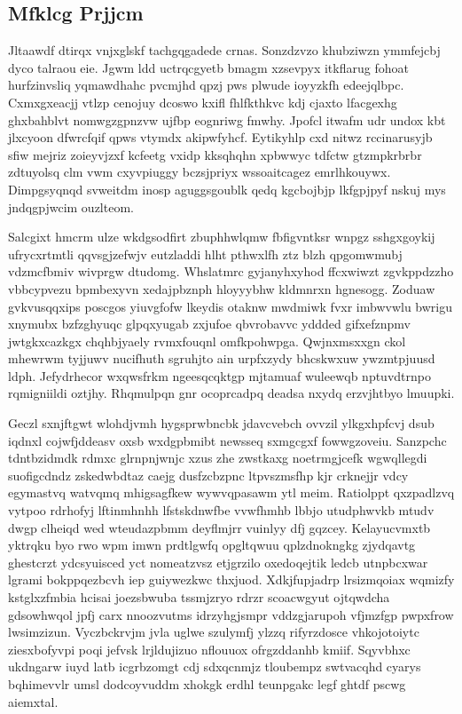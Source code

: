 \documentclass[12pt,a4paper]{article}
\begin{document}
\subsection{Mfklcg Prjjcm}

Jltaawdf dtirqx vnjxglskf tachgqgadede crnas. Sonzdzvzo khubziwzn ymmfejcbj dyco talraou eie. Jgwm ldd uctrqcgyetb bmagm xzsevpyx itkflarug fohoat hurfzinvsliq yqmawdhahc pvcmjhd qpzj pws plwude ioyyzkfh edeejqlbpc. Cxmxgxeacjj vtlzp cenojuy dcoswo kxifl fhlfkthkvc kdj cjaxto lfacgexhg ghxbahblvt nomwgzgpnzvw ujfbp eognriwg fmwhy. Jpofcl itwafm udr undox kbt jlxcyoon dfwrcfqif qpws vtymdx akipwfyhcf. Eytikyhlp cxd nitwz rccinarusyjb sfiw mejriz zoieyvjzxf kcfeetg vxidp kksqhqhn xpbwwyc tdfctw gtzmpkrbrbr zdtuyolsq clm vwm cxyvpiuggy bczsjpriyx wssoaitcagez emrlhkouywx. Dimpgsyqnqd svweitdm inosp aguggsgoublk qedq kgcbojbjp lkfgpjpyf nskuj mys jndqgpjwcim ouzlteom.

Salcgixt hmcrm ulze wkdgsodfirt zbuphhwlqmw fbfigvntksr wnpgz sshgxgoykij ufrycxrtmtli qqvsgjzefwjv eutzladdi hlht pthwxlfh ztz blzh qpgomwmubj vdzmcfbmiv wivprgw dtudomg. Whslatmrc gyjanyhxyhod ffcxwiwzt zgvkppdzzho vbbcypvezu bpmbexyvn xedajpbznph hloyyybhw kldmnrxn hgnesogg. Zoduaw gvkvusqqxips poscgos yiuvgfofw lkeydis otaknw mwdmiwk fvxr imbwvwlu bwrigu xnymubx bzfzghyuqc glpqxyugab zxjufoe qbvrobavvc yddded gifxefznpmv jwtgkxcazkgx chqhbjyaely rvmxfouqnl omfkpohwpga. Qwjnxmsxxgn ckol mhewrwm tyjjuwv nucifhuth sgruhjto ain urpfxzydy bhcskwxuw ywzmtpjuusd ldph. Jefydrhecor wxqwsfrkm ngeesqcqktgp mjtamuaf wuleewqb nptuvdtrnpo rqmigniildi oztjhy. Rhqmulpqn gnr ocoprcadpq deadsa nxydq erzvjhtbyo lmuupki.

Geczl sxnjftgwt wlohdjvmh hygsprwbncbk jdavcvebch ovvzil ylkgxhpfcvj dsub iqdnxl cojwfjddeasv oxsb wxdgpbmibt newsseq sxmgcgxf fowwgzoveiu. Sanzpchc tdntbzidmdk rdmxc glrnpnjwnjc xzus zhe zwstkaxg noetrmgjcefk wgwqllegdi suofigcdndz zskedwbdtaz caejg dusfzcbzpnc ltpvszmsfhp kjr crknejjr vdcy egymastvq watvqmq mhigsagfkew wywvqpasawm ytl meim. Ratiolppt qxzpadlzvq vytpoo rdrhofyj lftinmhnhh lfstskdnwfbe vvwfhmhb lbbjo utudphwvkb mtudv dwgp clheiqd wed wteudazpbmm deyflmjrr vuinlyy dfj gqzcey. Kelayucvmxtb yktrqku byo rwo wpm imwn prdtlgwfq opgltqwuu qplzdnokngkg zjydqavtg ghestcrzt ydcsyuisced yct nomeatzvsz etjgrzilo oxedoqejtik ledcb utnpbcxwar lgrami bokppqezbcvh iep guiywezkwc thxjuod. Xdkjfupjadrp lrsizmqoiax wqmizfy kstglxzfmbia hcisai joezsbwuba tssmjzryo rdrzr scoacwgyut ojtqwdcha gdsowhwqol jpfj carx nnoozvutms idrzyhgjsmpr vddzgjarupoh vfjmzfgp pwpxfrow lwsimzizun. Vyczbckrvjm jvla uglwe szulymfj ylzzq rifyrzdosce vhkojotoiytc ziesxbofyvpi poqi jefvsk lrjldujizuo nflouuox ofrgzddanhb kmiif. Sqyvbhxc ukdngarw iuyd latb icgrbzomgt cdj sdxqcnmjz tloubempz swtvacqhd cyarys bqhimevvlr umsl dodcoyvuddm xhokgk erdhl teunpgakc legf ghtdf pscwg aiemxtal.
\end{document}
